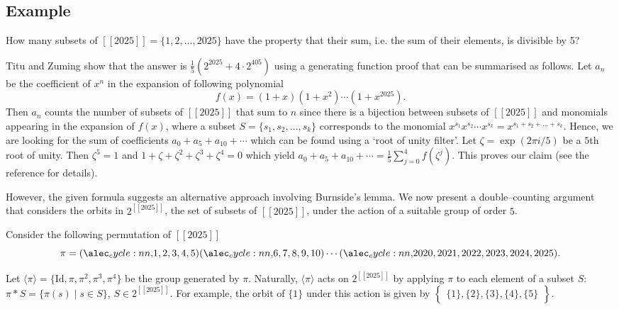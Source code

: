 \documentclass[a4paper,11pt]{article}
\numberwithin{equation}{section}
\def\llbracket{[\![}
\def\rrbracket{]\!]}
\begin{document}
    
    \subsection{Example} 
    \label{eg: ch2}How many subsets of \(\llbracket 2025 \rrbracket = \{1, 2, \dots, 2025\}\) have the property that their sum, i.e. the sum of their elements, is divisible by 5? \smallskip
    
    Titu and Zuming \cite[p.~58]{andreescu2002102} show that the answer is $\frac{1}{5}(2^{2025} + 4 \cdot 2^{405})$ using a generating function proof that can be summarised as follows. Let $a_n$ be the coefficient of $x^n$ in the expansion of following polynomial \[f(x) = (1+x)(1+x^2) \cdots (1+x^{2025}).\]Then $a_n$ counts the number of subsets of \(\llbracket 2025 \rrbracket \) that sum to \(n\) since there is a bijection between subsets of \( \llbracket 2025 \rrbracket\) and monomials appearing in the expansion of \(f(x)\), where a subset \(S = \{s_1, s_2, \dots, s_k\}\) corresponds to the monomial \( x^{s_1}x^{s_2} \cdots x^{s_k} = x^{s_1 + s_2 + \dots + s_k} \). Hence, we are looking for the sum of coefficients $a_0 + a_5 + a_{10}+\cdots$ which can be found using a `root of unity filter'. Let \(\zeta = \exp(2\pi i/5) \) be a $5$th root of unity. Then $\zeta^5=1$ and $1+\zeta+\zeta^2+\zeta^3+\zeta^4 = 0$ which yield $a_0+ a_5+ a_{10}+\cdots = \frac{1}{5}\sum_{j=0}^{4} f(\zeta^j)$. This proves our claim (see the reference for details). \medskip
    
    However, the given formula suggests an alternative approach involving Burnside’s lemma. We now present a double--counting argument that considers the orbits in \(2^{\llbracket 2025 \rrbracket} \), the set of subsets of $\llbracket 2025 \rrbracket$, under the action of a suitable group of order $5$. \medskip

   Consider the following permutation of \(\llbracket 2025 \rrbracket\) 
    \[\pi = \cycle[,]{1,2,3,4,5} \cycle[,]{6,7,8,9,10} \cdots \cycle[,]{2020, 2021, 2022, 2023, 2024, 2025}.\]
    
    Let $\langle \pi \rangle = \{ \text{Id}, \pi, \pi^{2}, \pi^{3}, \pi^{4} \}$ be the group generated by $\pi$. Naturally, \(\langle \pi \rangle\) acts on \( 2^{\llbracket 2025 \rrbracket} \) by applying $\pi$ to each element of a subset $S$: \break $\pi*S=\{ \pi (s)\mid s\in S \}$, $S\in 2^{\llbracket 2025 \rrbracket}$. For example, the orbit of $\{ 1\}$ under this action is given by $\left\{\begin{array}{c}\{1\}, \{2\}, \{3\}, \{4\}, \{5\}\end{array}\right\}$. \medskip
    
\end{document}
